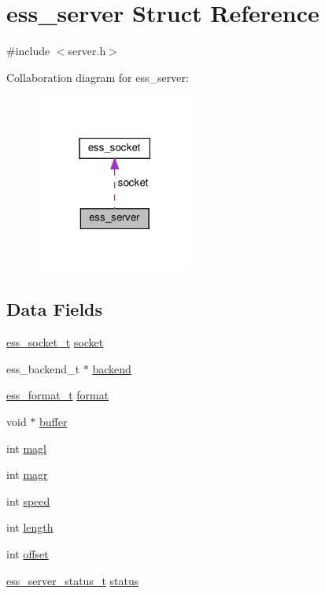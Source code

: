 \hypertarget{structess__server}{}\section{ess\+\_\+server Struct Reference}
\label{structess__server}


{\ttfamily \#include $<$server.\+h$>$}



Collaboration diagram for ess\+\_\+server\+:
\nopagebreak
\begin{figure}[H]
\begin{center}
\leavevmode
\includegraphics[width=147pt]{d0/d53/structess__server__coll__graph}
\end{center}
\end{figure}
\subsection*{Data Fields}
\begin{DoxyCompactItemize}
\item 
\hyperlink{ess__socket_8h_ab7457db5cd500e7f0d74d0bc07356663}{ess\+\_\+socket\+\_\+t} \hyperlink{structess__server_ae1095210270047614ecdcf9d808e764c}{socket}
\item 
ess\+\_\+backend\+\_\+t $\ast$ \hyperlink{structess__server_ab2b85d146ada2907a81371aace6e926d}{backend}
\item 
\hyperlink{ess__format_8h_ab03f24cb5d42f4448f713bf1ec178163}{ess\+\_\+format\+\_\+t} \hyperlink{structess__server_abb4395d1c05d3bbc2e1d011507ddd19b}{format}
\item 
void $\ast$ \hyperlink{structess__server_a368f7094dc38acca20612bbb392552f4}{buffer}
\item 
int \hyperlink{structess__server_a1aa199bcd52f6acf8edbf2ee6898a21b}{magl}
\item 
int \hyperlink{structess__server_a64b10d79850e935f9440886335b9f391}{magr}
\item 
int \hyperlink{structess__server_a218b4f7c6cc2681a99c23a3b089d68b1}{speed}
\item 
int \hyperlink{structess__server_a9f59b34b1f25fe00023291b678246bcc}{length}
\item 
int \hyperlink{structess__server_aed7ea92f45bd273dde380a45ddced592}{offset}
\item 
\hyperlink{server_8h_a66019638fd44eba9d951ec93754c7b8d}{ess\+\_\+server\+\_\+status\+\_\+t} \hyperlink{structess__server_af34befa103928930a907b2eb5cc4739c}{status}
\end{DoxyCompactItemize}


